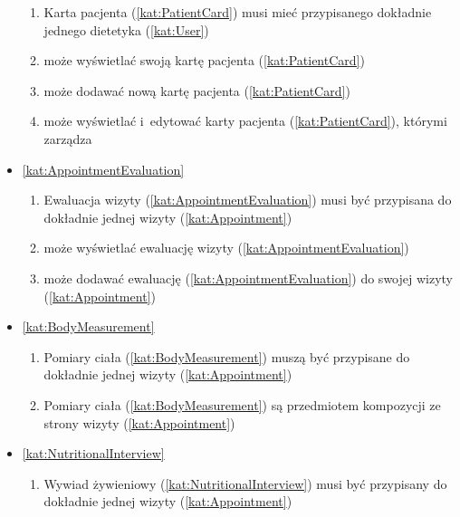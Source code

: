 \begin{itemize}[label={\textbf{Reguły dla}}, wide, labelwidth=!, labelindent=0pt]
\begin{enumerate}[label={\textbf{REG/\protect\threedigits{\arabic{enumi}}}}, wide, labelwidth=!, align=left, leftmargin=3cm, resume]
        \item Karta pacjenta (\ref{kat:PatientCard}) musi mieć przypisanego dokładnie jednego dietetyka (\ref{kat:User})
        \item {} może wyświetlać swoją kartę pacjenta (\ref{kat:PatientCard})
        \item {} może dodawać nową kartę pacjenta (\ref{kat:PatientCard})
        \item {} może wyświetlać i~edytować karty pacjenta (\ref{kat:PatientCard}), którymi zarządza
    \end{enumerate}
    \item\ref{kat:AppointmentEvaluation}
    \begin{enumerate}[label={\textbf{REG/\protect\threedigits{\arabic{enumi}}}}, wide, labelwidth=!, align=left, leftmargin=3cm, resume]
        \item Ewaluacja wizyty (\ref{kat:AppointmentEvaluation}) musi być przypisana do dokładnie jednej wizyty (\ref{kat:Appointment})
        \item {} może wyświetlać ewaluację wizyty (\ref{kat:AppointmentEvaluation})
        \item {} może dodawać ewaluację (\ref{kat:AppointmentEvaluation}) do swojej wizyty (\ref{kat:Appointment})
    \end{enumerate}
    \item\ref{kat:BodyMeasurement}
    \begin{enumerate}[label={\textbf{REG/\protect\threedigits{\arabic{enumi}}}}, wide, labelwidth=!, align=left, leftmargin=3cm, resume]
        \item Pomiary ciała (\ref{kat:BodyMeasurement}) muszą być przypisane do dokładnie jednej wizyty (\ref{kat:Appointment})
        \item Pomiary ciała (\ref{kat:BodyMeasurement}) są przedmiotem kompozycji ze strony wizyty (\ref{kat:Appointment})
    \end{enumerate}
    \item\ref{kat:NutritionalInterview}
    \begin{enumerate}[label={\textbf{REG/\protect\threedigits{\arabic{enumi}}}}, wide, labelwidth=!, align=left, leftmargin=3cm, resume]
        \item Wywiad żywieniowy (\ref{kat:NutritionalInterview}) musi być przypisany do dokładnie jednej wizyty (\ref{kat:Appointment})

\end{enumerate}
\end{itemize}
